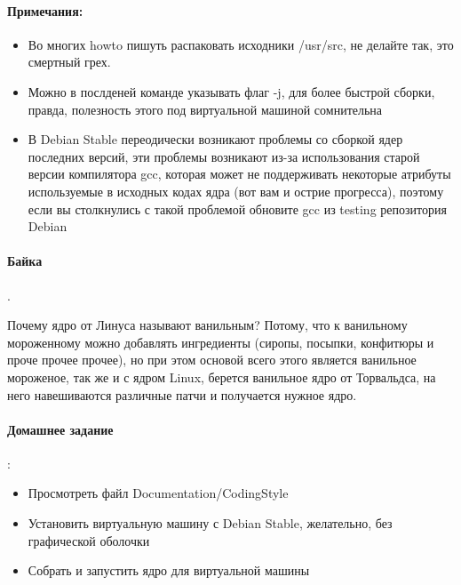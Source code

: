 \paragraph{Примечания:}

\begin{itemize}
\item Во многих howto пишуть распаковать исходники /usr/src, не делайте так, это смертный грех.

\item Можно в послденей команде указывать флаг -j, для более быстрой сборки, правда, полезность этого под виртуальной машиной сомнительна

\item В Debian Stable переодически возникают проблемы со сборкой ядер последних версий, эти проблемы возникают из-за использования старой версии
компилятора gcc, которая может не поддерживать некоторые атрибуты используемые в исходных кодах ядра (вот вам и острие прогресса), поэтому если вы столкнулись
с такой проблемой обновите gcc из testing репозитория Debian 
\end{itemize}

\paragraph{Байка}.

Почему ядро от Линуса называют ванильным? Потому, что к ванильному мороженному можно добавлять ингредиенты (сиропы, посыпки,
конфитюры и проче прочее прочее), но при этом основой всего этого является ванильное мороженое, так же и с ядром Linux, берется
ванильное ядро от Торвальдса, на него навешиваются различные патчи и получается нужное ядро.

\paragraph{Домашнее задание}:

\begin{itemize}
\item Просмотреть файл Documentation/CodingStyle

\item Установить виртуальную машину с Debian Stable, желательно, без графической оболочки

\item Собрать и запустить ядро для виртуальной машины
\end{itemize}